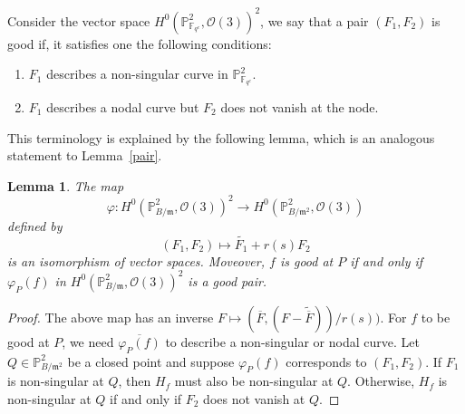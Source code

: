 \documentclass[12pt]{article}
\theoremstyle{plain}
\newtheorem{lemma}[equation]{Lemma}
\theoremstyle{definition}
\newcommand{\fm}{\mathfrak{m}}
\newcommand{\IF}{\mathbb{F}}
\newcommand{\IP}{\mathbb{P}}
\newcommand{\sO}{\mathcal{O}}
\newcommand{\<}{\langle}
\renewcommand{\>}{\rangle}
\def\wt{\widetilde}
\begin{document}
Consider the vector space $H^0(\IP^2_{\IF_{q^e}}, \sO(3))^2$, we say that a pair $(F_1, F_2)$ is good if, it satisfies one the following conditions:
\begin{enumerate}
\item $F_1$ describes a non-singular curve in $\IP^2_{\IF_{q^e}}$.
\item $F_1$ describes a nodal curve but $F_2$ does not vanish at the node.
\end{enumerate}  
This terminology is explained by the following lemma, which is an analogous statement to Lemma~\ref{pair}. 
\begin{lemma}
\label{conversion}
The map
$$ \varphi : H^0(\IP^2_{B/\fm} , \sO(3))^2 \to H^0(\IP^2_{B/\fm^2}, \sO(3))$$ defined by 
$$ (F_1, F_2) \mapsto \wt{F_1} + r(s) F_2 $$
is an isomorphism of vector spaces. Moveover, $f$ is good at $P$ if and only if $\varphi_P(f)$ in $H^0(\IP^2_{B/\fm} , \sO(3))^2$ is a good pair. 
\end{lemma}
\begin{proof}
The above map has an inverse $F \mapsto (\overline{F}, (F - \wt{\overline{F}}))/r(s))$. For $f$ to be good at $P$, we need $\overline{\varphi_P(f)}$ to describe a non-singular or nodal curve. Let $Q \in \IP^2_{B/\fm^2}$ be a closed point and suppose $\varphi_P(f)$ corresponds to $(F_1, F_2)$. If $F_1$ is non-singular at $Q$, then $H_f$ must also be non-singular at $Q$. Otherwise, $H_f$ is non-singular at $Q$ if and only if $F_2$ does not vanish at $Q$. 
\end{proof}
\end{document}

